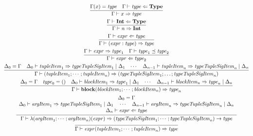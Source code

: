 \begin{gather*}
  \infer{\Gamma \vdash x \Rightarrow \mathit{type}}{
    \Gamma(x) = \mathit{type}
    &
    \Gamma \vdash \mathit{type} \Leftarrow \mathbf{Type}
  }
  \\
  \infer{\Gamma \vdash n \Rightarrow \mathbf{Int}}{
    \Gamma \vdash \mathbf{Int} \Leftarrow \mathbf{Type}
  }
  \\
  \infer{\Gamma \vdash (\mathit{expr}: \mathit{type}) \Rightarrow \mathit{type}}{
    \Gamma \vdash \mathit{expr} \Leftarrow \mathit{type}
  }
  \\
  \infer{\Gamma \vdash \mathit{expr} \Leftarrow \mathit{type}_2}{
    \Gamma \vdash \mathit{expr} \Rightarrow \mathit{type}_1
    &
    \Gamma \vdash \mathit{type}_1 \preceq \mathit{type}_2
  }
  \\
  \infer{\Gamma \vdash (\mathit{tupleItem}_1; \cdots; \mathit{tupleItem}_n) \Rightarrow (\mathit{typeTupleSigItem}_1; \ldots; \mathit{typeTupleSigItem}_n)}{
    \Delta_0 = \Gamma
    &
    \Delta_0 \vdash \mathit{tupleItem}_1 \Rightarrow \mathit{typeTupleSigItem}_1 \mid \Delta_1
    &
    \cdots
    &
    \Delta_{n - 1} \vdash \mathit{tupleItem}_n \Rightarrow \mathit{typeTupleSigItem}_n \mid \Delta_n
  }
  \\
  \infer{\Gamma \vdash \mathbf{block}(\mathit{blockItem}_1; \cdots; \mathit{blockItem}_n) \Rightarrow \mathit{type}_n}{
    \Delta_0 = \Gamma
    &
    \mathit{type}_0 = ()
    &
    \Delta_0 \vdash \mathit{blockItem}_1 \Rightarrow \mathit{type}_1 \mid \Delta_1
    &
    \cdots
    &
    \Delta_{n - 1} \vdash \mathit{blockItem}_n \Rightarrow \mathit{type}_n \mid \Delta_n
  }
  \\
  \infer{\Gamma \vdash \lambda(\mathit{argItem}_1; \cdots; \mathit{argItem}_n)(\mathit{expr}) \Rightarrow (\mathit{typeTupleSigItem}_1; \cdots; \mathit{typeTupleSigItem}_n) \rightarrow \mathit{type}}{
    \begin{array}{c}
      \Delta_0 = \Gamma
      \\
      \Delta_0 \vdash \mathit{argItem}_1 \Rightarrow \mathit{typeTupleSigItem}_1 \mid \Delta_1
      \hspace{1em}
      \cdots
      \hspace{1em}
      \Delta_{n - 1} \vdash \mathit{argItem}_n \Rightarrow \mathit{typeTupleSigItem}_n \mid \Delta_n
      \\
      \Delta_n \vdash \mathit{expr} \Leftarrow \mathit{type}
    \end{array}
  }
  \\
  \infer{\Gamma \vdash \mathit{expr}(\mathit{tupleItem}_1; \cdots; \mathit{tupleItem}_n) \Rightarrow \mathit{type}}{
}
\end{gather*}
